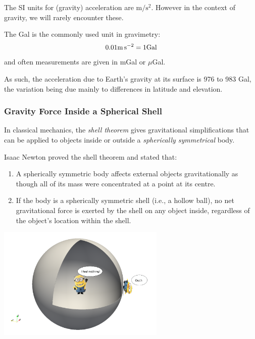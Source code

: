 The SI units for (gravity) acceleration are $\si{\metre\per\square\second}$.
However in the context of gravity, we will rarely encounter these.

The Gal is the commonly used unit in gravimetry:
\[
0.01 \si{\metre\per\square\second} = 1 {\rm Gal}
\]
and often measurements are given in mGal or $\mu$Gal.

As such, the acceleration due to Earth's gravity 
at its surface is 976 to 983 Gal, the variation being due 
mainly to differences in latitude and elevation. 


\subsubsection{Gravity Force Inside a Spherical Shell}



In classical mechanics, the {\it shell theorem} gives 
gravitational simplifications that can be applied to objects inside or outside a 
{\it spherically symmetrical} body. 

Isaac Newton proved the shell theorem and stated that:
\begin{enumerate}
\item A spherically symmetric body affects external objects gravitationally as though all of its mass were concentrated at a point at its centre.
\item If the body is a spherically symmetric shell (i.e., a hollow ball), no net gravitational force is exerted by the shell on any object inside, regardless of the object's location within the shell.
\end{enumerate}

\begin{center}
\includegraphics[width=8cm]{images/gravity/drawing}
\end{center}

